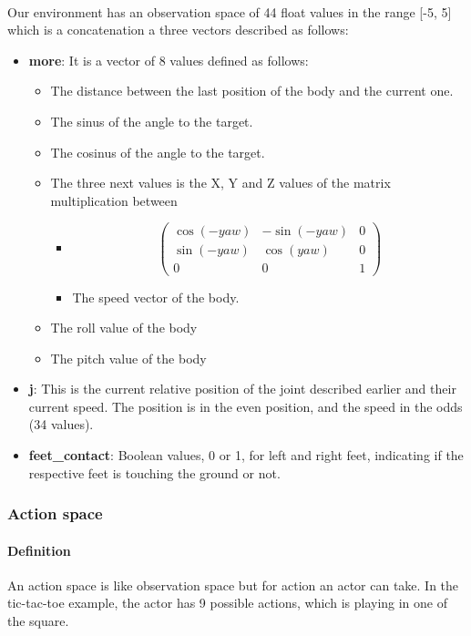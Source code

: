 \documentclass{article}
\begin{document}
\paragraph{}
Our environment has an observation space of 44 float values in the range [-5,
5] which is a concatenation a three vectors described as follows:
\begin{itemize}
\item{\textbf{more}: It is a vector of 8 values defined as follows:
    \begin{itemize}
    \item{The distance between the last position of the body and the current one.}
    \item{The sinus of the angle to the target.}
    \item{The cosinus of the angle to the target.}
    \item{The three next values is the X, Y and Z values of the matrix multiplication between
        \begin{itemize}
        \item{\[\left(
                \begin{matrix}
                  \cos(-yaw) & -\sin(-yaw) & 0 \\
                  \sin(-yaw) & \cos(yaw) & 0 \\
                  0 & 0 & 1
                \end{matrix}\right)
            \]}
        \item{The speed vector of the body.}
        \end{itemize}}
    \item{The roll value of the body}
    \item{The pitch value of the body}
    \end{itemize}}
\item{\textbf{j}: This is the current relative position of the joint described earlier and their current speed. The position is in the even position, and the speed in the odds (34 values).}
\item{\textbf{feet\_contact}: Boolean values, 0 or 1, for left and right feet, indicating if the respective feet is touching the ground or not.}
\end{itemize}

\subsubsection{Action space}

\paragraph{Definition} An action space is like observation space but for action
an actor can take. In the tic-tac-toe example, the actor has 9 possible actions,
which is playing in one of the square. 
\end{document}
